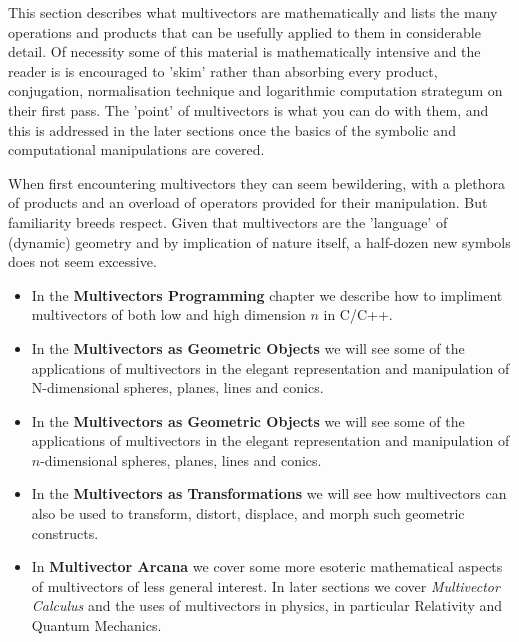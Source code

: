 \documentclass[a4paper]{book}
\numberwithin{equation}{chapter}
\begin{document}
\vspace{\baselineskip}

This section describes what multivectors are mathematically and lists the many operations and products that 
can be usefully applied to them in considerable detail. Of necessity some of this material is mathematically 
intensive and the reader is is encouraged to 'skim' rather than absorbing every product, conjugation,
normalisation technique and logarithmic computation strategum on their first pass. The 'point' of 
multivectors is what you can do with them, and this is addressed in the later sections once the basics of the 
symbolic and computational manipulations are covered.

\vspace{\baselineskip}

When first encountering multivectors they can seem bewildering, with a plethora of products and an overload
of operators provided for their manipulation. But familiarity breeds respect. Given that multivectors are the
'language' of (dynamic) geometry and by implication of nature itself, a half-dozen new symbols does not seem 
excessive.


\vspace{\baselineskip}
\begin{itemize}
    \item In the \textbf{Multivectors Programming} chapter we describe how to impliment multivectors of both low and high dimension $n$ in C/C++.

    \item In the \textbf{Multivectors as Geometric Objects} we will see some of the applications of 
    multivectors in the elegant representation and manipulation of N-dimensional spheres, planes, lines
    and conics.

    \item In the \textbf{Multivectors as Geometric Objects} we will see some of the applications of multivectors in the elegant representation and manipulation of $n$-dimensional spheres, planes, lines and conics.
    
    \item In the \textbf{Multivectors as Transformations} we will see how multivectors can also be used to transform, distort, displace, and morph such geometric constructs.
    
    \item In \textbf{Multivector Arcana} we cover some more esoteric mathematical aspects of multivectors of less general interest. In later sections we cover \emph{Multivector Calculus} and the uses of multivectors in physics, in  particular Relativity and Quantum Mechanics.
\end{itemize}
\end{document}
